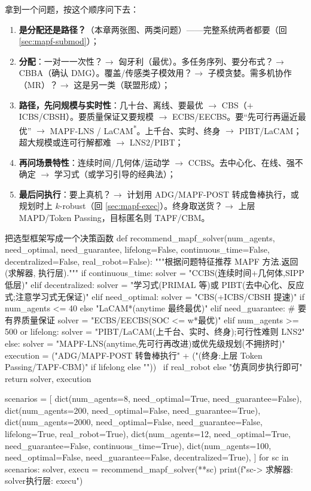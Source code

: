 拿到一个问题，按这个顺序问下去：

\begin{enumerate}
  \item \textbf{是分配还是路径？}（本章两张图、两类问题）——完整系统两者都要（回 \cref{sec:mapf-submod}）；
  \item \textbf{分配}：一对一一次性？$\to$ 匈牙利（最优）。多任务序列、要分布式？$\to$ CBBA（确认 DMG）。覆盖/传感类子模效用？$\to$ 子模贪婪。需多机协作（MR）？$\to$ 这是另一类（联盟形成）；
  \item \textbf{路径，先问规模与实时性}：几十台、离线、要最优 $\to$ CBS（$+$ICBS/CBSH）。要质量保证又要规模 $\to$ ECBS/EECBS。要“先可行再逼近最优” $\to$ MAPF-LNS / LaCAM\textsuperscript{*}。上千台、实时、终身 $\to$ PIBT/LaCAM；超大规模或连可行解都难 $\to$ LNS2/PIBT；
  \item \textbf{再问场景特性}：连续时间/几何体/运动学 $\to$ CCBS。去中心化、在线、强不确定 $\to$ 学习式（或学习引导的经典法）；
  \item \textbf{最后问执行}：要上真机？$\to$ 计划用 ADG/MAPF-POST 转成鲁棒执行，或规划时上 $k$-robust（回 \cref{sec:mapf-exec}）。终身取送货？$\to$ 上层 MAPD/Token Passing，目标匿名则 TAPF/CBM。
\end{enumerate}

\begin{codebox}[Python]{把选型框架写成一个决策函数}
def recommend_mapf_solver(num_agents, need_optimal, need_guarantee,
                          lifelong=False, continuous_time=False,
                          decentralized=False, real_robot=False):
    """根据问题特征推荐 MAPF 方法.返回(求解器, 执行层)."""
    if continuous_time:
        solver = "CCBS(连续时间+几何体,SIPP 低层)"
    elif decentralized:
        solver = "学习式(PRIMAL 等)或 PIBT(去中心化、反应式;注意学习式无保证)"
    elif need_optimal:
        solver = "CBS(+ICBS/CBSH 提速)" if num_agents <= 40 else "LaCAM*(anytime 最终最优)"
    elif need_guarantee:                                  # 要有界质量保证
        solver = "ECBS/EECBS(SOC <= w*最优)"
    elif num_agents >= 500 or lifelong:
        solver = "PIBT/LaCAM(上千台、实时、终身);可行性难则 LNS2"
    else:
        solver = "MAPF-LNS(anytime,先可行再改进)或优先级规划(不拥挤时)"
    execution = ("ADG/MAPF-POST 转鲁棒执行" + ("(终身:上层 Token Passing/TAPF-CBM)" if lifelong else "")) \
                if real_robot else "仿真同步执行即可"
    return solver, execution

scenarios = [
    dict(num_agents=8,    need_optimal=True,  need_guarantee=False),
    dict(num_agents=200,  need_optimal=False, need_guarantee=True),
    dict(num_agents=2000, need_optimal=False, need_guarantee=False, lifelong=True, real_robot=True),
    dict(num_agents=12,   need_optimal=True,  need_guarantee=False, continuous_time=True),
    dict(num_agents=100,  need_optimal=False, need_guarantee=False, decentralized=True),
]
for sc in scenarios:
    solver, execu = recommend_mapf_solver(**sc)
    print(f"{sc}\n  -> 求解器: {solver}\n     执行层: {execu}\n")
\end{codebox}

